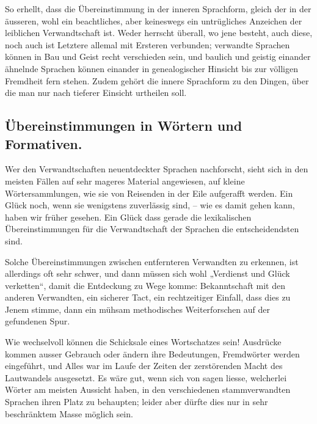 So erhellt, dass die Übereinstimmung in der inneren Sprachform, gleich der in der äusseren, wohl ein beachtliches, aber keineswegs ein untrügliches Anzeichen der leiblichen Verwandtschaft ist. Weder herrscht überall, wo jene besteht, auch diese, noch auch ist Letztere allemal mit  Ersteren verbunden; verwandte Sprachen können in Bau und Geist recht verschieden sein, und baulich und geistig einander ähnelnde Sprachen können einander in genealogischer Hinsicht bis zur völligen Fremdheit fern stehen. Zudem gehört die innere Sprachform zu den Dingen, über die man nur nach tieferer Einsicht urtheilen soll.

\subsection*{ Übereinstimmungen in Wörtern und Formativen.}\label{III.I.I.2Addelta} 
 Wer den Verwandtschaften neuentdeckter Sprachen nachforscht, sieht sich in den meisten Fällen auf sehr mageres Material angewiesen, auf kleine Wörter\-\label{sp.152}sammlungen, wie sie von Reisenden in der Eile aufgerafft werden. Ein Glück noch, wenn sie wenigstens zuverlässig sind, – wie es damit gehen kann, haben wir früher gesehen. Ein Glück  dass gerade die lexikalischen Übereinstimmungen für die Verwandtschaft der Sprachen die entscheidendsten sind.

Solche Übereinstimmungen zwischen entfernteren Verwandten zu erkennen, ist allerdings oft sehr schwer, und dann müssen sich wohl „Verdienst und Glück verketten“, damit die Entdeckung zu Wege komme: Bekanntschaft mit den anderen Verwandten, ein sicherer Tact, ein rechtzeitiger Einfall, dass dies zu Jenem stimme, dann ein mühsam methodisches Weiterforschen auf der gefundenen Spur.

Wie wechselvoll können die Schicksale eines Wortschatzes sein! Ausdrücke kommen ausser Gebrauch oder ändern ihre Bedeutungen, \label{fp.162} Fremdwörter werden eingeführt, und Alles war im Laufe der Zeiten der zerstörenden Macht des Lautwandels ausgesetzt. Es wäre gut, wenn sich von  sagen liesse, welcherlei Wörter am meisten Aussicht haben, in den verschiedenen stammverwandten Sprachen ihren Platz zu behaupten; leider aber dürfte dies nur in sehr beschränktem Masse möglich sein.

